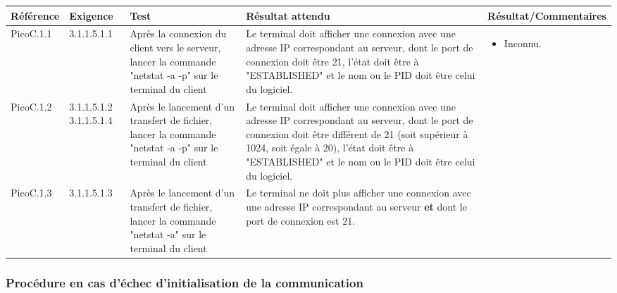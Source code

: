 \documentclass[10pt,a4paper,landscape]{report}
\begin{document}
\begin{center}
	\bgroup
	\def\arraystretch{1.5}
	\begin{tabular}{|p{2.5cm}|p{2cm}|p{8cm}|p{8cm}|p{5cm}|}
		\hline
		\rowcolor{gris}Référence & Exigence & Test & Résultat attendu & Résultat/Commentaires\\
		\hline
		PicoC.1.1 & 3.1.1.5.1.1 & Après la connexion du client vers le serveur, lancer la commande "netstat -a -p" sur le terminal du client & Le terminal doit afficher une connexion avec une adresse IP correspondant au serveur, dont le port de connexion doit être 21, l'état doit être à "ESTABLISHED" et le nom ou le PID doit être celui du logiciel.&\vspace*{-0.2cm} \begin{itemize}[label=$\ast$] \item \textcolor{ukwn}{Inconnu.}\end{itemize} \\
		\hline
		PicoC.1.2 & 3.1.1.5.1.2 3.1.1.5.1.4 & Après le lancement d'un transfert de fichier, lancer la commande "netstat -a -p" sur le terminal du client & Le terminal doit afficher une connexion avec une adresse IP correspondant au serveur, dont le port de connexion doit être différent de 21 (soit supérieur à 1024, soit égale à 20), l'état doit être à "ESTABLISHED" et le nom ou le PID doit être celui du logiciel. & \\
		\hline
		PicoC.1.3 & 3.1.1.5.1.3 & Après le lancement d'un transfert de fichier, lancer la commande "netstat -a" sur le terminal du client & Le terminal ne doit plus afficher une connexion avec une adresse IP correspondant au serveur \textbf{et} dont le port de connexion est 21. &\\
		\hline
	\end{tabular}
	\egroup
\end{center}

\subsubsection{Procédure en cas d'échec d'initialisation de la communication}
\end{document}
